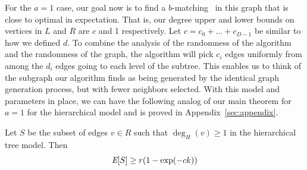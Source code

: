 For the $a=1$ case, our goal now is to find a $b$-matching~\cite{Gabow1983} in this
graph that is close to optimal in expectation. That is, our degree
upper and lower bounds on vertices in $L$ and $R$ are $c$ and 1
respectively. Let $c = c_0 + \ldots + c_{D-1}$ be similar to how we
defined $d$.  To combine the analysis of the randomness of the
algorithm and the randomness of the graph, the algorithm will pick
$c_{i}$ edges uniformly from among the $d_{i}$ edges going to each
level of the subtree. This enables us to think of the subgraph our
algorithm finds as being generated by the identical graph generation
process, but with fewer neighbors selected. With this model and
parameters in place, we can have the following analog of our main
theorem for $a=1$ for the hierarchical model and is proved in Appendix~\ref{sec:appendix}.

\begin{thm}
Let $S$ be the subset of edges $v\in R$ such that $\deg_H(v) \geq 1$ in the hierarchical tree model. Then
\[ \emph{\text{E}}[S] \geq r(1-\exp(-ck)) \]
\end{thm}

%
%

